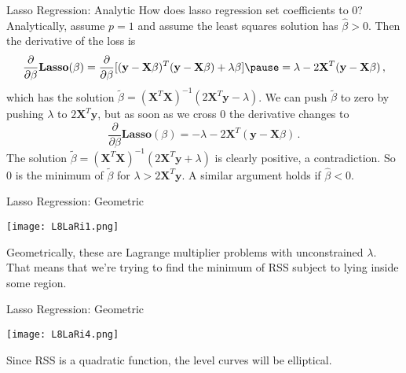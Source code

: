 \documentclass[10pt, table, dvipsnames,xcdraw,handout]{beamer}
\newcommand{\bfX}{\ensuremath{\mathbf{X}}}
\newcommand{\bfy}{\ensuremath{\mathbf{y}}}
\begin{document}
\begin{frame}[fragile]{Lasso Regression: Analytic} 
How does lasso regression set coefficients to 0? Analytically, assume $p=1$ and assume the least squares solution has $\hat \beta>0$. \pause Then the derivative of the loss is
$$
\frac{\partial}{\partial \beta}\textbf{Lasso}(\beta) = \frac{\partial}{\partial \beta}[(\bfy - \bfX\beta)^T(\bfy - \bfX\beta) + \lambda \beta]
\pause =
\lambda-2\bfX^T(\bfy - \bfX\beta)\,,
$$
which has the solution $\tilde \beta = (\bfX^T\bfX)^{-1}(2\bfX^T\bfy - \lambda)$. \pause We can push $ \tilde\beta$ to zero by pushing $\lambda$ to $2\bfX^T\bfy$, but as soon as we cross 0 the derivative changes to
$$
\frac{\partial}{\partial \beta}\textbf{Lasso}(\beta) = -\lambda-2\bfX^T(\bfy - \bfX\beta)\,.
$$\pause
The solution $\tilde \beta  = (\bfX^T\bfX)^{-1}(2\bfX^T\bfy + \lambda)$ is clearly positive, a contradiction. So 0 is the minimum of $\tilde\beta$ for $\lambda>2\bfX^T\bfy$. \pause A similar argument holds if $\hat \beta<0$. 

\end{frame}





\begin{frame}[fragile]{Lasso Regression: Geometric} 
  \begin{minipage}[t][0.5\textheight][t]{\textwidth}
	\centering \texttt{[image: L8LaRi1.png]} 
  \end{minipage}
  \vfill
\begin{minipage}[t][0.5\textheight][t]{\textwidth}
Geometrically, these are Lagrange multiplier problems with unconstrained $\lambda$. That means that we're trying to find the minimum of RSS subject to lying inside some region.
\end{minipage}
\end{frame}





\begin{frame}[fragile]{Lasso Regression: Geometric} 
  \begin{minipage}[t][0.5\textheight][t]{\textwidth}
	\centering \texttt{[image: L8LaRi4.png]} 
  \end{minipage}
  \vfill
\begin{minipage}[t][0.5\textheight][t]{\textwidth}
Since RSS is a quadratic function, the {\color{red}level curves} will be elliptical. 
\end{minipage}
\end{frame}
\end{document}
